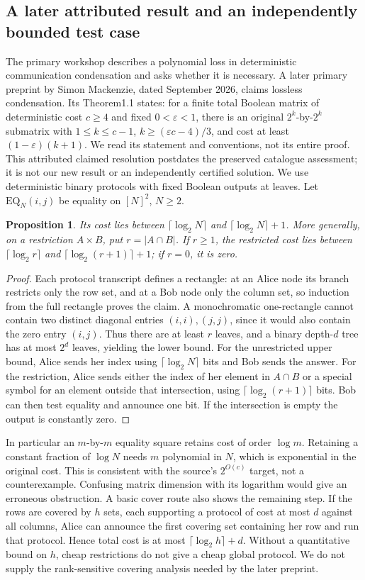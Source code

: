 \documentclass[11pt]{article}
\newtheorem{proposition}{Proposition}
\begin{document}
\subsection{A later attributed result and an independently bounded test case}
The primary workshop describes a polynomial loss in deterministic communication condensation and asks whether it is necessary. A later primary preprint by Simon Mackenzie, dated September 2026, claims lossless condensation. Its Theorem1.1 states: for a finite total Boolean matrix of deterministic cost $c\ge4$ and fixed $0<\varepsilon<1$, there is an original $2^k$-by-$2^k$ submatrix with $1\le k\le c-1$, $k\ge(\varepsilon c-4)/3$, and cost at least $(1-\varepsilon)(k+1)$. We read its statement and conventions, not its entire proof. This attributed claimed resolution postdates the preserved catalogue assessment; it is not our new result or an independently certified solution.
We use deterministic binary protocols with fixed Boolean outputs at leaves. Let $\mathrm{EQ}_N(i,j)$ be equality on $[N]^2$, $N\ge2$.
\begin{proposition}
Its cost lies between $\lceil\log_2N\rceil$ and $\lceil\log_2N\rceil+1$. More generally, on a restriction $A\times B$, put $r=|A\cap B|$. If $r\ge1$, the restricted cost lies between $\lceil\log_2r\rceil$ and $\lceil\log_2(r+1)\rceil+1$; if $r=0$, it is zero.
\end{proposition}
\begin{proof}
Each protocol transcript defines a rectangle: at an Alice node its branch restricts only the row set, and at a Bob node only the column set, so induction from the full rectangle proves the claim. A monochromatic one-rectangle cannot contain two distinct diagonal entries $(i,i),(j,j)$, since it would also contain the zero entry $(i,j)$. Thus there are at least $r$ leaves, and a binary depth-$d$ tree has at most $2^d$ leaves, yielding the lower bound. For the unrestricted upper bound, Alice sends her index using $\lceil\log_2N\rceil$ bits and Bob sends the answer. For the restriction, Alice sends either the index of her element in $A\cap B$ or a special symbol for an element outside that intersection, using $\lceil\log_2(r+1)\rceil$ bits. Bob can then test equality and announce one bit. If the intersection is empty the output is constantly zero.
\end{proof}
In particular an $m$-by-$m$ equality square retains cost of order $\log m$. Retaining a constant fraction of $\log N$ needs $m$ polynomial in $N$, which is exponential in the original cost. This is consistent with the source's $2^{O(c)}$ target, not a counterexample. Confusing matrix dimension with its logarithm would give an erroneous obstruction.
A basic cover route also shows the remaining step. If the rows are covered by $h$ sets, each supporting a protocol of cost at most $d$ against all columns, Alice can announce the first covering set containing her row and run that protocol. Hence total cost is at most $\lceil\log_2h\rceil+d$. Without a quantitative bound on $h$, cheap restrictions do not give a cheap global protocol. We do not supply the rank-sensitive covering analysis needed by the later preprint.
\end{document}
